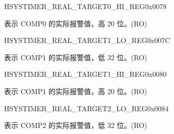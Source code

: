 \begin{register}{H}{SYSTIMER\_REAL\_TARGET0\_HI\_REG}{0x0078}\label{regdesc:SYSTIMERREALTARGET0HIREG}
%
%
\regnewline%
\begin{regdesc}\begin{reglist}
\label{fielddesc:SYSTIMERTARGET0HIRO}\item [SYSTIMER\_TARGET0\_HI\_RO] 表示 COMP0 的实际报警值，高 20 位。(RO)
\end{reglist}\end{regdesc}
\end{register}


\begin{register}{H}{SYSTIMER\_REAL\_TARGET1\_LO\_REG}{0x007C}\label{regdesc:SYSTIMERREALTARGET1LOREG}
%
\regnewline%
\begin{regdesc}\begin{reglist}
\label{fielddesc:SYSTIMERTARGET1LORO}\item [SYSTIMER\_TARGET1\_LO\_RO] 表示 COMP1 的实际报警值，低 32 位。(RO)
\end{reglist}\end{regdesc}
\end{register}


\begin{register}{H}{SYSTIMER\_REAL\_TARGET1\_HI\_REG}{0x0080}\label{regdesc:SYSTIMERREALTARGET1HIREG}
%
%
\regnewline%
\begin{regdesc}\begin{reglist}
\label{fielddesc:SYSTIMERTARGET1HIRO}\item [SYSTIMER\_TARGET1\_HI\_RO] 表示 COMP1 的实际报警值，高 20 位。(RO)
\end{reglist}\end{regdesc}
\end{register}


\begin{register}{H}{SYSTIMER\_REAL\_TARGET2\_LO\_REG}{0x0084}\label{regdesc:SYSTIMERREALTARGET2LOREG}
%
\regnewline%
\begin{regdesc}\begin{reglist}
\label{fielddesc:SYSTIMERTARGET2LORO}\item [SYSTIMER\_TARGET2\_LO\_RO] 表示 COMP2 的实际报警值，低 32 位。(RO)
\end{reglist}\end{regdesc}
\end{register}


